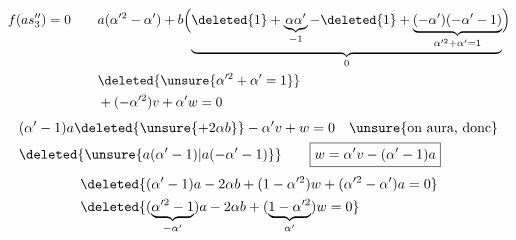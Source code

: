 \[
\begin{aligned}
f(as''_3)=0&\qquad a(\alpha^{\prime 2}-\alpha')
+b\Bigl(\underbrace{\deleted{1}+\underbrace{\alpha\alpha'}_{-1}-\deleted{1}+\underbrace{(-\alpha')(-\alpha'-1)}_{\alpha^{\prime 2}+\alpha'=1}}_{0}\Bigr)\\
&\qquad\deleted{\unsure{\alpha^{\prime 2}+\alpha'=1}}\\
&\qquad+(-\alpha^{\prime 2})v+\alpha'w=0
\end{aligned}
\]
\[
\begin{aligned}
&(\alpha'-1)a\deleted{\unsure{+2\alpha b}}-\alpha'v+w=0
\quad\text{\unsure{on aura, donc}}\\
&\deleted{\unsure{a(\alpha'-1)|a(-\alpha'-1)}}\qquad\boxed{w=\alpha'v-(\alpha'-1)a}
\end{aligned}
\]
\[
\begin{aligned}
&\deleted{(\alpha'-1)a-2\alpha b+(1-\alpha^{\prime 2})w+(\alpha^{\prime 2}-\alpha')a=0}\\
&\deleted{(\underbrace{\alpha^{\prime 2}-1}_{-\alpha'})a-2\alpha b+(\underbrace{1-\alpha^{\prime 2}}_{\alpha'})w=0}
\end{aligned}
\]




